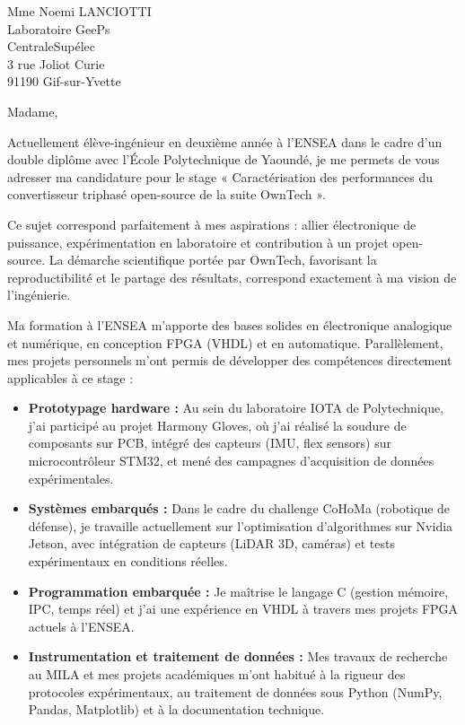 \documentclass[11pt,a4paper]{letter}
\begin{document}
\begin{letter}{Mme Noemi LANCIOTTI\\Laboratoire GeePs\\CentraleSupélec\\3 rue Joliot Curie\\91190 Gif-sur-Yvette}

\opening{Madame,}

Actuellement élève-ingénieur en deuxième année à l'ENSEA dans le cadre d'un double diplôme avec l'École Polytechnique de Yaoundé, je me permets de vous adresser ma candidature pour le stage « Caractérisation des performances du convertisseur triphasé open-source de la suite OwnTech ».

Ce sujet correspond parfaitement à mes aspirations : allier électronique de puissance, expérimentation en laboratoire et contribution à un projet open-source. La démarche scientifique portée par OwnTech, favorisant la reproductibilité et le partage des résultats, correspond exactement à ma vision de l'ingénierie.

Ma formation à l'ENSEA m'apporte des bases solides en électronique analogique et numérique, en conception FPGA (VHDL) et en automatique. Parallèlement, mes projets personnels m'ont permis de développer des compétences directement applicables à ce stage :

\begin{itemize}
    \item \textbf{Prototypage hardware :} Au sein du laboratoire IOTA de Polytechnique, j'ai participé au projet Harmony Gloves, où j'ai réalisé la soudure de composants sur PCB, intégré des capteurs (IMU, flex sensors) sur microcontrôleur STM32, et mené des campagnes d'acquisition de données expérimentales.
    
    \item \textbf{Systèmes embarqués :} Dans le cadre du challenge CoHoMa (robotique de défense), je travaille actuellement sur l'optimisation d'algorithmes sur Nvidia Jetson, avec intégration de capteurs (LiDAR 3D, caméras) et tests expérimentaux en conditions réelles.
    
    \item \textbf{Programmation embarquée :} Je maîtrise le langage C (gestion mémoire, IPC, temps réel) et j'ai une expérience en VHDL à travers mes projets FPGA actuels à l'ENSEA.
    
    \item \textbf{Instrumentation et traitement de données :} Mes travaux de recherche au MILA et mes projets académiques m'ont habitué à la rigueur des protocoles expérimentaux, au traitement de données sous Python (NumPy, Pandas, Matplotlib) et à la documentation technique.
    

\end{itemize}
\end{letter}
\end{document}
